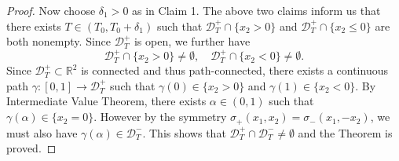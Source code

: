 \documentclass[11pt,reqno]{amsproc}
\newcommand{\R}{\mathbb{R}}
\newcommand{\calD}{\mathcal{D}}
\begin{document}
\begin{proof}
    Now choose $\delta_1 > 0$ as in Claim 1. The above two claims inform us that there exists $T \in (T_0, T_0 + \delta_1)$ such that $\calD_T^+ \cap \{x_2 > 0\}$ and $\calD_T^+ \cap \{x_2 \le 0\}$ are both nonempty. Since $\calD_T^+$ is open, we further have
    $$
    \calD_T^+ \cap \{x_2 > 0\}\neq \emptyset,\quad \calD_T^+ \cap \{x_2 < 0\} \neq \emptyset.
    $$
    Since $\calD_T^+ \subset \R^2$ is connected and thus path-connected, there exists a continuous path $\gamma:[0,1] \to \calD_T^+$ such that $\gamma(0) \in \{x_2 > 0\}$ and $\gamma(1) \in \{x_2 < 0\}$. By Intermediate Value Theorem, there exists $\alpha \in (0,1)$ such that $\gamma(\alpha) \in \{x_2 = 0\}$. However by the symmetry $\sigma_+ (x_1,x_2) = \sigma_-(x_1,-x_2)$, we must also have $\gamma(\alpha) \in \calD_T^-$. This shows that $\calD_T^+ \cap \calD_T^- \neq \emptyset$ and the Theorem is proved.
\end{proof}
\end{document}
